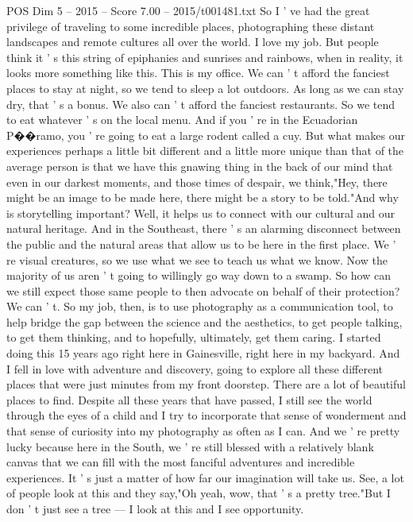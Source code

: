\begin{textsample}{POS Dim 5 – 2015 – Score 7.00 – 2015/t001481.txt}  \label{ex:f5_pos_053}
So I ' ve had the great privilege of traveling to some incredible places, photographing these distant landscapes and remote cultures all over the world.
I love my job.
But people think it ' s this string of epiphanies and sunrises and rainbows, when in reality, it looks more something like this.
This is my office.
We can ' t afford the fanciest places to stay at night, so we tend to sleep a lot outdoors.
As long as we can stay dry, that ' s a bonus.
We also can ' t afford the fanciest restaurants.
So we tend to eat whatever ' s on the local menu.
And if you ' re in the Ecuadorian P{\EmojiFont �}{\EmojiFont �}ramo, you ' re going to eat a large rodent called a cuy.
But what makes our experiences perhaps a little bit different and a little more unique than that of the average person is that we have this gnawing thing in the back of our mind that even in our darkest moments, and those times of despair, we think,"Hey, there might be an image to be made here, there might be a story to be told."And why is storytelling important?
Well, it helps us to connect with our cultural and our natural heritage.
And in the Southeast, there ' s an alarming disconnect between the public and the natural areas that allow us to be here in the first place.
We ' re visual creatures, so we use what we see to teach us what we know.
Now the majority of us aren ' t going to willingly go way down to a swamp.
So how can we still expect those same people to then advocate on behalf of their protection?
We can ' t.
So my job, then, is to use photography as a communication tool, to help bridge the gap between the science and the aesthetics, to get people talking, to get them thinking, and to hopefully, ultimately, get them caring.
I started doing this 15 years ago right here in Gainesville, right here in my backyard.
And I fell in love with adventure and discovery, going to explore all these different places that were just minutes from my front doorstep.
There are a lot of beautiful places to find.
Despite all these years that have passed, I still see the world through the eyes of a child and I try to incorporate that sense of wonderment and that sense of curiosity into my photography as often as I can.
And we ' re pretty lucky because here in the South, we ' re still blessed with a relatively blank canvas that we can fill with the most fanciful adventures and incredible experiences.
It ' s just a matter of how far our imagination will take us.
See, a lot of people look at this and they say,"Oh yeah, wow, that ' s a pretty tree."But I don ' t just see a tree — I look at this and I see opportunity.

\end{textsample}
